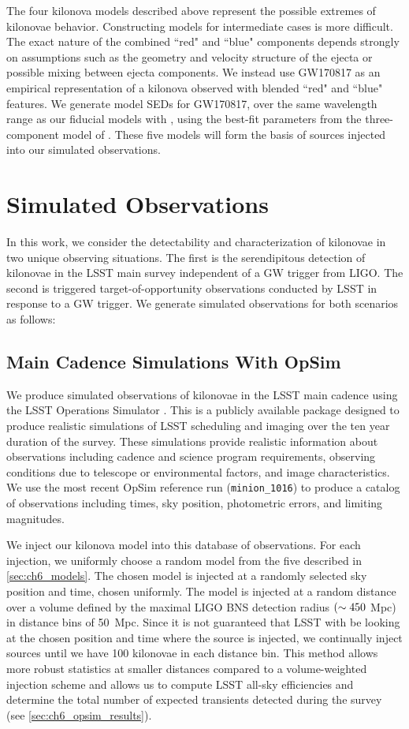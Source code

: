 The four kilonova models described above represent the possible extremes of kilonovae behavior. Constructing models for intermediate cases is more difficult. The exact nature of the combined ``red" and ``blue" components depends strongly on assumptions such as the geometry and velocity structure of the ejecta or possible mixing between ejecta components. We instead use GW170817 as an empirical representation of a kilonova observed with blended ``red" and ``blue" features. We generate model SEDs for GW170817, over the same wavelength range as our fiducial models with \mosfit, using the best-fit parameters from the three-component model of \citep{Villar+17b}. These five models will form the basis of sources injected into our simulated observations.

\clearpage
\section{Simulated Observations}
\label{sec:ch6_obs}

In this work, we consider the detectability and characterization of kilonovae in two unique observing situations. The first is the serendipitous detection of kilonovae in the LSST main survey independent of a GW trigger from LIGO. The second is triggered target-of-opportunity observations conducted by LSST in response to a GW trigger. We generate simulated observations for both scenarios as follows: 

\subsection{Main Cadence Simulations With OpSim}
\label{sec:ch6_opsim}
We produce simulated observations of kilonovae in the LSST main cadence using the LSST Operations Simulator \citep[OpSim,][]{OpSim1,OpSim2}. This is a publicly available package designed to produce realistic simulations of LSST scheduling and imaging over the ten year duration of the survey. These simulations provide realistic information about observations including cadence and science program requirements, observing conditions due to telescope or environmental factors, and image characteristics. We use the most recent OpSim reference run ({\tt minion\_1016}) to produce a catalog of observations including times, sky position, photometric errors, and limiting magnitudes.

We inject our kilonova model into this database of observations. For each injection, we uniformly choose a random model from the five described in \cref{sec:ch6_models}. The chosen model is injected at a randomly selected sky position and time, chosen uniformly. The model is injected at a random  
distance over a volume defined by the maximal LIGO BNS detection radius $(\sim450$ Mpc) in distance bins of 50~Mpc. Since it is not guaranteed that LSST with be looking at the chosen position and time where the source is injected, we continually inject sources until we have 100 kilonovae in each distance bin. This method allows more robust statistics at smaller distances compared to a volume-weighted injection scheme and allows us to compute LSST all-sky efficiencies and determine the total number of expected transients detected during the survey (see \cref{sec:ch6_opsim_results}).

